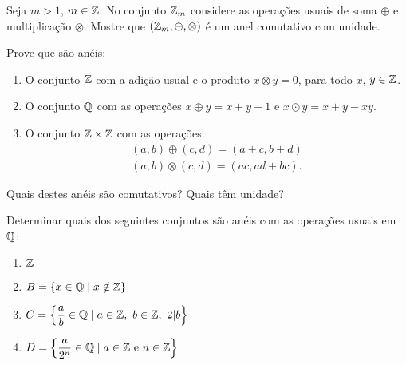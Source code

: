 \documentclass[12pt]{exam}
\begin{document}
    \vspace{.4cm}

    \questao{} Seja $m > 1$, $m \in \mathbb{Z}$. No conjunto $\mathbb{Z}_m$ considere as opera\c{c}\~oes usuais de soma $\oplus$ e multiplica\c{c}\~ao $\otimes$. Mostre que $(\mathbb{Z}_m, \oplus, \otimes)$ \'e um anel comutativo com unidade.

    \vspace{.4cm}

    \questao{} Prove que s\~ao an\'eis:
    \begin{enumerate}[label={\alph*})]
        \item O conjunto $\mathbb{Z}$ com a adi\c{c}\~ao usual e o produto $x \otimes y = 0$, para todo $x$, $y \in \mathbb{Z}$.
        \item O conjunto $\mathbb{Q}$ com as opera\c{c}\~oes $x \oplus y = x + y - 1$ e $x \odot y = x + y - xy$.
        \item O conjunto $\mathbb{Z} \times \mathbb{Z}$ com as opera\c{c}\~oes:
        \begin{align*}
            (a, b) \oplus (c, d) = (a + c, b + d)\\
            (a ,b) \otimes (c, d) = (ac, ad + bc).
        \end{align*}
    \end{enumerate}
    Quais destes an\'eis s\~ao comutativos? Quais t\^em unidade?

    \vspace{.4cm}

    \questao{} Determinar quais dos seguintes conjuntos s\~ao an{\'e}is com as opera\c{c}\~oes usuais em $\mathbb{Q}$:
        \begin{multicols}{2}
            \begin{enumerate}[label=({\alph*})]
                \item $\mathbb{Z}$
                \item $B = \{x \in \mathbb{Q} \mid x \notin \mathbb{Z}\}$
                \item $C = \left\{\dfrac{a}{b} \in \mathbb{Q} \mid a \in \mathbb{Z},\ b \in \mathbb{Z},\ 2 |b \right\}$
                \item $D = \left\{\dfrac{a}{2^n} \in \mathbb{Q} \mid a \in \mathbb{Z} \mbox{ e } n \in \mathbb{Z} \right\}$
            \end{enumerate}
        \end{multicols}

    \vspace{.4cm}
\end{document}
